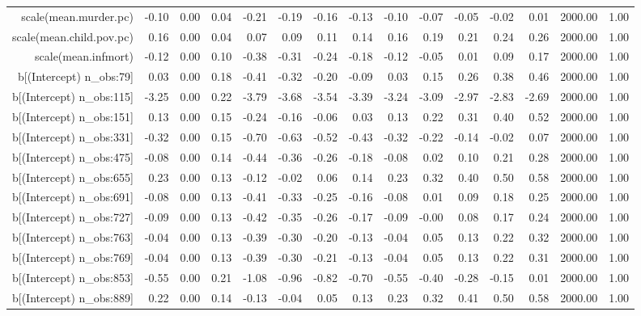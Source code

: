 \begin{table}[ht]
\begin{tabular}{rrrrrrrrrrrrrrr}
  scale(mean.murder.pc) & -0.10 & 0.00 & 0.04 & -0.21 & -0.19 & -0.16 & -0.13 & -0.10 & -0.07 & -0.05 & -0.02 & 0.01 & 2000.00 & 1.00 \\ 
  scale(mean.child.pov.pc) & 0.16 & 0.00 & 0.04 & 0.07 & 0.09 & 0.11 & 0.14 & 0.16 & 0.19 & 0.21 & 0.24 & 0.26 & 2000.00 & 1.00 \\ 
  scale(mean.infmort) & -0.12 & 0.00 & 0.10 & -0.38 & -0.31 & -0.24 & -0.18 & -0.12 & -0.05 & 0.01 & 0.09 & 0.17 & 2000.00 & 1.00 \\ 
  b[(Intercept) n\_obs:79] & 0.03 & 0.00 & 0.18 & -0.41 & -0.32 & -0.20 & -0.09 & 0.03 & 0.15 & 0.26 & 0.38 & 0.46 & 2000.00 & 1.00 \\ 
  b[(Intercept) n\_obs:115] & -3.25 & 0.00 & 0.22 & -3.79 & -3.68 & -3.54 & -3.39 & -3.24 & -3.09 & -2.97 & -2.83 & -2.69 & 2000.00 & 1.00 \\ 
  b[(Intercept) n\_obs:151] & 0.13 & 0.00 & 0.15 & -0.24 & -0.16 & -0.06 & 0.03 & 0.13 & 0.22 & 0.31 & 0.40 & 0.52 & 2000.00 & 1.00 \\ 
  b[(Intercept) n\_obs:331] & -0.32 & 0.00 & 0.15 & -0.70 & -0.63 & -0.52 & -0.43 & -0.32 & -0.22 & -0.14 & -0.02 & 0.07 & 2000.00 & 1.00 \\ 
  b[(Intercept) n\_obs:475] & -0.08 & 0.00 & 0.14 & -0.44 & -0.36 & -0.26 & -0.18 & -0.08 & 0.02 & 0.10 & 0.21 & 0.28 & 2000.00 & 1.00 \\ 
  b[(Intercept) n\_obs:655] & 0.23 & 0.00 & 0.13 & -0.12 & -0.02 & 0.06 & 0.14 & 0.23 & 0.32 & 0.40 & 0.50 & 0.58 & 2000.00 & 1.00 \\ 
  b[(Intercept) n\_obs:691] & -0.08 & 0.00 & 0.13 & -0.41 & -0.33 & -0.25 & -0.16 & -0.08 & 0.01 & 0.09 & 0.18 & 0.25 & 2000.00 & 1.00 \\ 
  b[(Intercept) n\_obs:727] & -0.09 & 0.00 & 0.13 & -0.42 & -0.35 & -0.26 & -0.17 & -0.09 & -0.00 & 0.08 & 0.17 & 0.24 & 2000.00 & 1.00 \\ 
  b[(Intercept) n\_obs:763] & -0.04 & 0.00 & 0.13 & -0.39 & -0.30 & -0.20 & -0.13 & -0.04 & 0.05 & 0.13 & 0.22 & 0.32 & 2000.00 & 1.00 \\ 
  b[(Intercept) n\_obs:769] & -0.04 & 0.00 & 0.13 & -0.39 & -0.30 & -0.21 & -0.13 & -0.04 & 0.05 & 0.13 & 0.22 & 0.31 & 2000.00 & 1.00 \\ 
  b[(Intercept) n\_obs:853] & -0.55 & 0.00 & 0.21 & -1.08 & -0.96 & -0.82 & -0.70 & -0.55 & -0.40 & -0.28 & -0.15 & 0.01 & 2000.00 & 1.00 \\ 
  b[(Intercept) n\_obs:889] & 0.22 & 0.00 & 0.14 & -0.13 & -0.04 & 0.05 & 0.13 & 0.23 & 0.32 & 0.41 & 0.50 & 0.58 & 2000.00 & 1.00 \\ 

\end{tabular}
\end{table}
